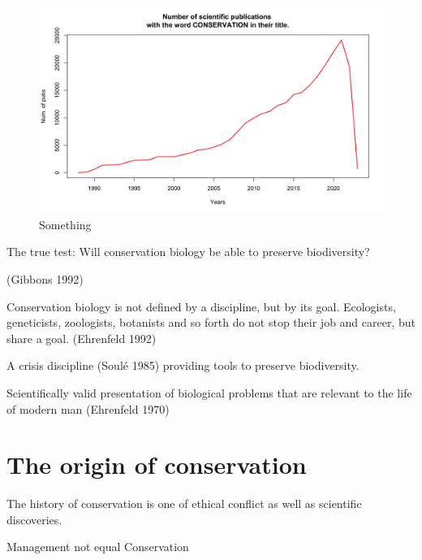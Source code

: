 \documentclass[
  ignorenonframetext,
]{beamer}
\begin{document}
\begin{frame}
\begin{figure}

{\centering \includegraphics{../figures/class_1_num_of_pubs.png}

}

\caption{Something}

\end{figure}
\end{frame}

\begin{frame}
The true test: Will conservation biology be able to preserve
biodiversity?

(Gibbons 1992)
\end{frame}

\begin{frame}
Conservation biology is not defined by a discipline, but by its goal.
Ecologists, geneticists, zoologists, botanists and so forth do not stop
their job and career, but share a goal. (Ehrenfeld 1992)

A crisis discipline (Soulé 1985) providing tools to preserve
biodiversity.

Scientifically valid presentation of biological problems that are
relevant to the life of modern man (Ehrenfeld 1970)
\end{frame}

\hypertarget{the-origin-of-conservation}{%
\section{The origin of conservation}\label{the-origin-of-conservation}}

\begin{frame}
The history of conservation is one of ethical conflict as well as
scientific discoveries.

Management not equal Conservation
\end{frame}
\end{document}
